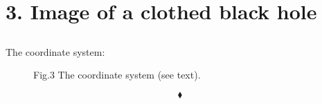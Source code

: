 \chapter{3. Image of a clothed black hole}
\pagebreak[4]

\section{}
\begin{tcolorbox}
The coordinate system:
\end{tcolorbox}

\begin{figure}[H]

\caption{Fig.3 The coordinate system (see text).}
\label{fig:fig_3}
\end{figure}

$$\blacklozenge$$\newpage